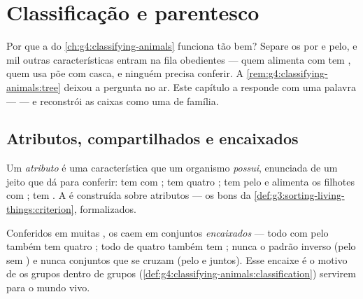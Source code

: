 \chapter{Classificação e parentesco}\label{ch:g6:classification-kinship}

Por que a  do \cref{ch:g4:classifying-animals} funciona
tão bem? Separe os  por  e pelo, e mil outras
características entram na fila obedientes --- quem alimenta com 
tem , quem usa  põe  com casca, e ninguém
precisa conferir. A \cref{rem:g4:classifying-animals:tree} deixou a
pergunta no ar. Este capítulo a responde com uma palavra ---
 --- e reconstrói as caixas como uma  de família.

\section{Atributos, compartilhados e encaixados}

\begin{definition}[Atributo]\label{def:g6:classification-kinship:attribute}
Um \emph{atributo} é uma característica que um
organismo \emph{possui}, enunciada de um jeito que dá para conferir:
tem  com ; tem quatro ; tem pelo e
alimenta os filhotes com ; tem . A  é
construída sobre atributos --- os bons  da
\cref{def:g3:sorting-living-things:criterion}, formalizados.
\end{definition}

\begin{proposition}\label{prop:g6:classification-kinship:nest}
Conferidos em muitas , os  caem em conjuntos
\emph{encaixados} --- todo  com pelo também tem quatro ;
todo  de quatro  também tem ; nunca o
padrão inverso (pelo sem ) e nunca conjuntos que se cruzam (pelo
e  juntos). Esse encaixe é o motivo de os grupos dentro de grupos
(\cref{def:g4:classifying-animals:classification}) servirem para o
mundo vivo.
\end{proposition}
\admitted

